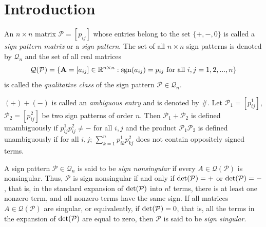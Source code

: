 \documentclass[a4paper, 10pt]{article}
\numberwithin{equation}{section}
\def\det{{\rm det}}
\def\sgn{{\rm sgn}}
\begin{document}
	
	
	
	
	
	
	
	
	\section{Introduction}
	
	An $n\times n$ matrix $\mathcal{P}=[p_{ij}]$ whose entries belong to the set $\{+,-,0\}$ is called a \textit{sign pattern matrix} or a \textit{sign pattern}. The set of all $n\times n$ sign patterns is denoted by $\mathcal{Q}_n$ and the set of all real matrices $$\mathcal{Q}(\mathcal{P})=\{\mathbf{A}=[a_{ij}]\in\mathbb{R}^{n\times n}: \sgn(a_{ij})=p_{ij}~ \text{for} ~\text{all}~ i,j=1,2,...,n\}$$ is called the \textit{qualitative class} of the sign pattern $\mathcal{P}\in \mathcal{Q}_n$.
	
	$(+)+(-)$ is called an \textit{ambiguous entry} and is denoted by \#. Let $\mathcal{P}_1=[p^1_{ij}]$, $\mathcal{P}_2=[p^2_{ij}]$ be two sign patterns of order $n$. Then $\mathcal{P}_1+\mathcal{P}_2$ is defined unambiguously if $p^1_{ij}p^2_{ij}\neq -$ for all $i,j$ and the product $\mathcal{P}_1 \mathcal{P}_2$ is defined unambiguously if for all $i,j$; $\sum_{k=1}^{n}{p^1_{ik}p^2_{kj}}$ does not contain oppositely signed terms.
	
	A sign pattern $\mathcal{P}\in \mathcal{Q}_n$ is said to be \textit{sign nonsingular} if every $A\in \mathcal{Q}(\mathcal{P})$ is nonsingular. Thus, $\mathcal{P}$ is sign nonsingular if and only if $\det(\mathcal{P})=+$ or $\det(\mathcal{P})=-$, that is, in the standard expansion of $\det(\mathcal{P})$ into $n!$ terms, there is at least one nonzero term, and all nonzero terms have the same sign.
	If all matrices $A\in \mathcal{Q(\mathcal{P})}$ are singular, or equivalently, if $\det(\mathcal{P})=0$, that is, all the terms in the expansion of $\det(\mathcal{P})$ are equal to zero, then $\mathcal{P}$ is said to be \textit{sign singular}.
	
\end{document}
